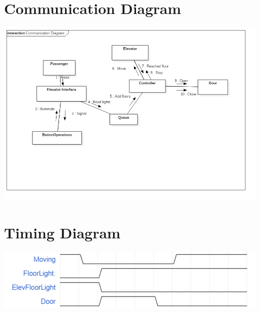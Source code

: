 \documentclass[a4paper, norsk]{article}
\begin{document}
\section{Communication Diagram}
\includegraphics[width=\textwidth]{./Collaboration2__Interaction1__Communication_Diagram_5.png}

\section{Timing Diagram}
\includegraphics[width=\textwidth]{./Timing_Diagram.png}
\end{document}
